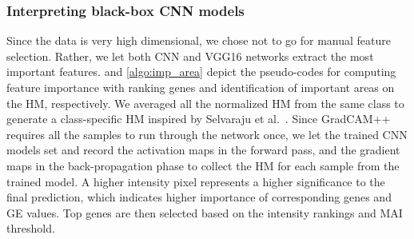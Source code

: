 \subsubsection{Interpreting black-box CNN models}
Since the data is very high dimensional, we chose not to go for manual feature selection. Rather, we let both CNN and VGG16 networks extract the most important features.  and \ref{algo:imp_area} depict the pseudo-codes for computing feature importance with ranking genes and identification of important areas on the HM, respectively. We averaged all the normalized HM from the same class to generate a class-specific HM inspired by Selvaraju et al.~\cite{mostavi2019convolutional,karim2019onconetexplainer}. Since GradCAM++ requires all the samples to run through the network once, we let the trained CNN models set and record the activation maps in the forward pass, and the gradient maps in the back-propagation phase to collect the HM for each sample from the trained model. A higher intensity pixel represents a higher significance to the final prediction, which indicates higher importance of corresponding genes and GE values. Top genes are then selected based on the intensity rankings and MAI threshold. 

